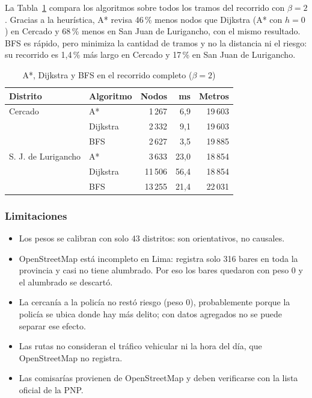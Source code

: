 La Tabla~\ref{tab:busqueda} compara los algoritmos sobre todos los tramos del recorrido con $\beta=2$. Gracias a la heurística, A* revisa 46\,\% menos nodos que Dijkstra (A* con $h=0$) en Cercado y 68\,\% menos en San Juan de Lurigancho, con el mismo resultado. BFS es rápido, pero minimiza la cantidad de tramos y no la distancia ni el riesgo: su recorrido es 1,4\,\% más largo en Cercado y 17\,\% en San Juan de Lurigancho.

\begin{table}[htbp]
\caption{A*, Dijkstra y BFS en el recorrido completo ($\beta=2$)}
\label{tab:busqueda}
\centering
\begin{tabular}{llrrr}
\toprule
Distrito & Algoritmo & Nodos & ms & Metros \\
\midrule
Cercado & A* & 1\,267 & 6,9 & 19\,603 \\
 & Dijkstra & 2\,332 & 9,1 & 19\,603 \\
 & BFS & 2\,627 & 3,5 & 19\,885 \\
\midrule
S. J. de Lurigancho & A* & 3\,633 & 23,0 & 18\,854 \\
 & Dijkstra & 11\,506 & 56,4 & 18\,854 \\
 & BFS & 13\,255 & 21,4 & 22\,031 \\
\bottomrule
\end{tabular}
\end{table}


\subsubsection{Limitaciones}
\begin{itemize}
  \item Los pesos se calibran con solo 43 distritos: son orientativos, no causales.
  \item OpenStreetMap está incompleto en Lima: registra solo 316 bares en toda la provincia y casi no tiene alumbrado. Por eso los bares quedaron con peso 0 y el alumbrado se descartó.
  \item La cercanía a la policía no restó riesgo (peso 0), probablemente porque la policía se ubica donde hay más delito; con datos agregados no se puede separar ese efecto.
  \item Las rutas no consideran el tráfico vehicular ni la hora del día, que OpenStreetMap no registra.
  \item Las comisarías provienen de OpenStreetMap y deben verificarse con la lista oficial de la PNP.
\end{itemize}

